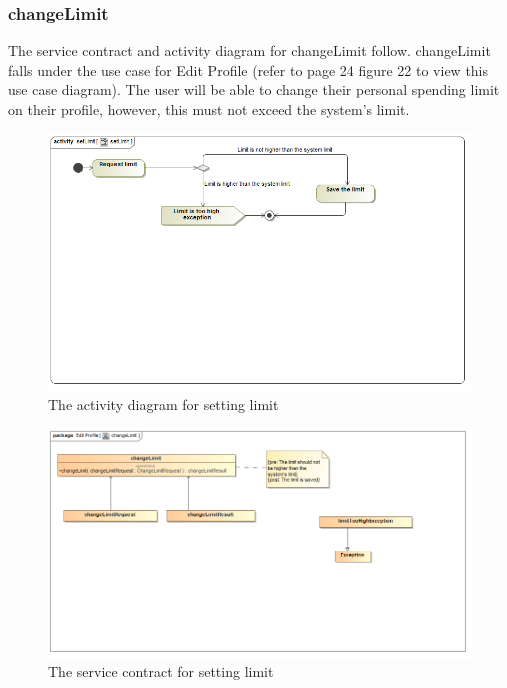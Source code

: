 \documentclass[a4paper,12pt]{report}
\begin{document}
\subsubsection{changeLimit}
The service contract and activity diagram for changeLimit follow. changeLimit falls under the use case for Edit Profile (refer to page 24 figure 22 to view this use case diagram). The user will be able to change their personal spending limit on their profile, however, this must not exceed the system's limit.
\begin{figure}[H]
  \centering
    \includegraphics[width=1.0\textwidth]{../Diagrams/ManageProfile/ActivityDiagrams/setLimit.png}
    \caption{The activity diagram for setting limit} 
\end{figure}

\begin{figure}[H]
	\centering
	\includegraphics[width=1.0\textwidth]{../Diagrams/ManageProfile/serviceContracts/changeLimitServiceContract.png}
	\caption{The service contract for setting limit}
\end{figure}
 
\end{document}
